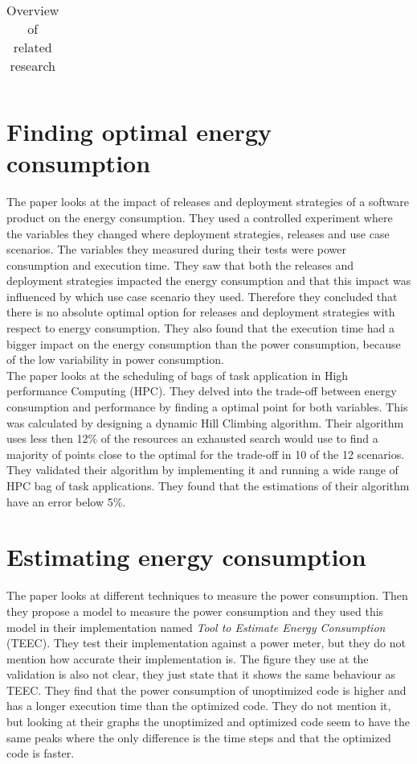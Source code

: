 \begin{table}[h]
{\begin{tabular}{|l|l|l|l|}
\end{tabular}%
}
\caption{Overview of related research}
\label{table:LiteratureStudy}
\end{table}

\section{Finding optimal energy consumption}
The paper \cite{verdecchia2017estimating} looks at the impact of releases and deployment strategies of a software product on the energy consumption. They used a controlled experiment where the variables they changed where deployment strategies, releases and use case scenarios. The variables they measured during their tests were power consumption and execution time. They saw that both the releases and deployment strategies impacted the energy consumption and that this impact was influenced by which use case scenario they used. Therefore they concluded that there is no absolute optimal option for releases and deployment strategies with respect to energy consumption. They also found that the execution time had a bigger impact on the energy consumption than the power consumption, because of the low variability in power consumption.\\

The paper \cite{filip2015bats} looks at the scheduling of bags of task application in High performance Computing (HPC). They delved into the trade-off between energy consumption and performance by finding a optimal point for both variables. This was calculated by designing a dynamic Hill Climbing algorithm. Their algorithm uses less then 12\% of the resources an exhausted search would use to find a majority of points close to the optimal for the trade-off in 10 of the 12 scenarios. They validated their algorithm by implementing it and running a wide range of HPC bag of task applications. They found that the estimations of their algorithm have an error below 5\%.\\

\section{Estimating energy consumption}
The paper \cite{acar2016impact} looks at different techniques to measure the power consumption. Then they propose a model to measure the power consumption and they used this model in their implementation named \textit{Tool to Estimate Energy Consumption} (TEEC). They test their implementation against a power meter, but they do not mention how accurate their implementation is. The figure they use at the validation is also not clear, they just state that it shows the same behaviour as TEEC. They find that the power consumption of unoptimized code is higher and has a longer execution time than the optimized code. They do not mention it, but looking at their graphs the unoptimized and optimized code seem to have the same peaks where the only difference is the time steps and that the optimized code is faster.\\

